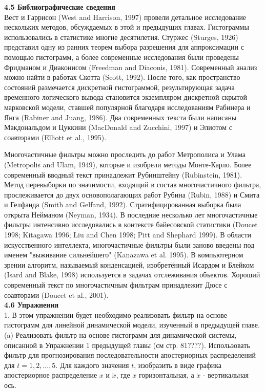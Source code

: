 \documentclass[10pt,a4paper]{article}
\begin{document}
\textbf{4.5 Библиографические сведения}\\

Вест и Гаррисон (West and Harrison, 1997) провели детальное исследование нескольких методов, обсуждаемых в этой и предыдущих главах. Гистограммы использовались в статистике многие десятилетия. Стуржес (Sturges, 1926) представил одну из ранних теорем выбора разрешения для аппроксимации с помощью гистограмм, а более современные исследования были проведены Фридманом и Диаконисом (Freedman and Diaconis, 1981). Современный анализ можно найти в работах Скотта (Scott, 1992). После того, как пространство состояний размечается дискретной гистограммой, результирующая задача временного логического вывода становится экземпляром дискретной скрытой марковской модели, ставшей популярной благодаря исследованиям Рабинера и Янга (Rabiner and Juang, 1986). Два современных текста были написаны Макдональдом и Цуккини (MacDonald and Zucchini, 1997) и Элиотом с соавторами (Elliott et al., 1995).

Многочастичные фильтры можно проследить до работ Метрополиса и Улама (Metropolis and Ulam, 1949), которые и изобрели методы Монте-Карло. Более современный вводный текст принадлежит Рубинштейну (Rubinstein, 1981). Метод перевыборки по значимости, входящий в состав многочастичного фильтра, прослеживается до двух основополагающих работ Рубина (Rubin, 1988) и Смита и Гелфанда (Smith and Gelfand, 1992). Стратифицированная выборка была открыта Нейманом (Neyman, 1934). В последние несколько лет многочастичные фильтры интенсивно исследовались в контексте байесовской статистики (Doucet 1998; Kitagawa 1996; Liu and Chen 1998; Pitt and Shephard 1999).
В области искусственного интеллекта, многочастичные фильтры были заново введены под именем "выживание сильнейшего" (Kanazawa et al. 1995). В компьютерном зрении алгоритм, называемый конденсацией, изобретённый Исардом и Блейком (Isard and Blake, 1998) используется в задачах отслеживания объектов. Хороший современный текст по многочастичным фильтрам принадлежит Дюсе с соавторами (Doucet et al., 2001).\\

\textbf{4.6 Упражнения}\\

1. В этом упражнении будет необходимо реализовать фильтр на основе гистограмм для линейной динамической модели, изученный в предыдущей главе.\\

(a) Реализовать фильтр на основе гистограмм для динамической системы, описанной в Упражнении 1 предыдущей главы (см стр. 81????). Использовать фильтр для прогнозирования последовательности апостериорных распределений для $t = 1, 2, . . . , 5$. Для каждого значения $t$, изобразить в виде графика апостериорное распределение $x$ и $\dot{x}$, где $x$ горизонтальная, а $\dot{x}$ - вертикальная ось.\\
\end{document}
